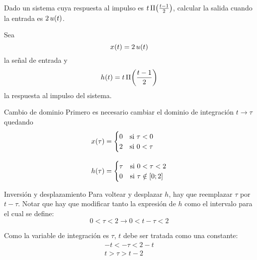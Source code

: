 \begin{mdframed}[style=ExampleFrame]
    \begin{example}
    \end{example}
    Dado un sistema cuya respuesta al impulso es $t \, \pulse[1]{t}{2}$, calcular la salida cuando la entrada es $2 \, \fx[u]{t}$.


    Sea
    \[
        \fx[x]{t} = 2 \, \fx[u]{t}
    \]
    la señal de entrada y
    \[
        \fx[h]{t} = t \, \pulse[1]{t}{2}
    \]
    la respuesta al impulso del sistema.

    \begin{numset}
        \begin{numitem}{Cambio de dominio}
            Primero es necesario cambiar el dominio de integración $t \longrightarrow \tau$ quedando
            \begin{align*}
                \fx[x]{\tau}
                & =
                \begin{cases}
                    0 & \text{si } \tau < 0
                    \\
                    2 & \text{si } 0 < \tau
                \end{cases}
                \\[2ex]
                \fx[h]{\tau}
                & =
                \begin{cases}
                    \tau & \text{si } 0 < \tau < 2
                    \\
                    0 & \text{si } \tau \notin [0;2]
                \end{cases}
            \end{align*}
        \end{numitem}

        \begin{numitem}{Inversión y desplazamiento}
            Para voltear y desplazar $h$, hay que reemplazar $\tau$ por $t - \tau$.
            Notar que hay que modificar tanto la expresión de $h$ como el intervalo para el cual se define:
            \[
                0 < \tau < 2
                \longrightarrow
                0 < t - \tau < 2
            \]

            Como la variable de integración es $\tau$, $t$ debe ser tratada como una constante:
            \begin{gather*}
                - t < - \tau < 2 - t
                \\
                t > \tau > t - 2
            \end{gather*}


\end{numitem}
\end{numset}
\end{mdframed}

